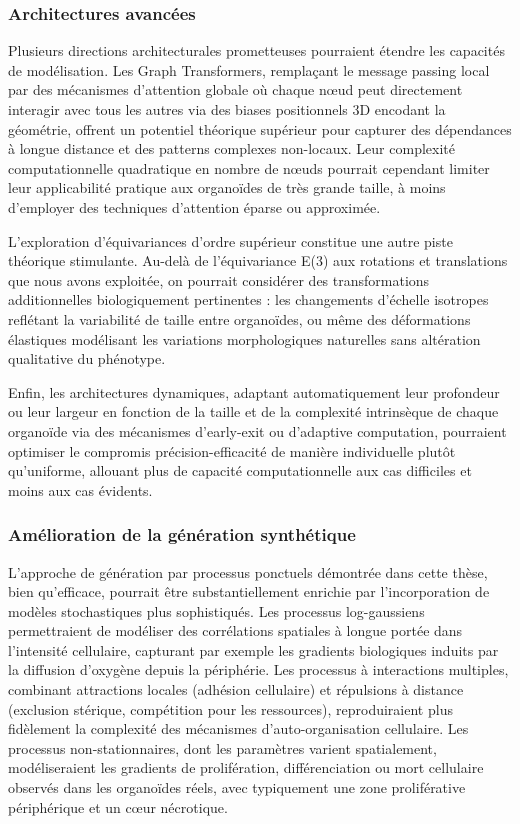 \subsubsection{Architectures avancées}

Plusieurs directions architecturales prometteuses pourraient étendre les capacités de modélisation. Les Graph Transformers, remplaçant le message passing local par des mécanismes d'attention globale où chaque nœud peut directement interagir avec tous les autres via des biases positionnels 3D encodant la géométrie, offrent un potentiel théorique supérieur pour capturer des dépendances à longue distance et des patterns complexes non-locaux. Leur complexité computationnelle quadratique en nombre de nœuds pourrait cependant limiter leur applicabilité pratique aux organoïdes de très grande taille, à moins d'employer des techniques d'attention éparse ou approximée.

L'exploration d'équivariances d'ordre supérieur constitue une autre piste théorique stimulante. Au-delà de l'équivariance E(3) aux rotations et translations que nous avons exploitée, on pourrait considérer des transformations additionnelles biologiquement pertinentes : les changements d'échelle isotropes reflétant la variabilité de taille entre organoïdes, ou même des déformations élastiques modélisant les variations morphologiques naturelles sans altération qualitative du phénotype.

Enfin, les architectures dynamiques, adaptant automatiquement leur profondeur ou leur largeur en fonction de la taille et de la complexité intrinsèque de chaque organoïde via des mécanismes d'early-exit ou d'adaptive computation, pourraient optimiser le compromis précision-efficacité de manière individuelle plutôt qu'uniforme, allouant plus de capacité computationnelle aux cas difficiles et moins aux cas évidents.

\subsubsection{Amélioration de la génération synthétique}

L'approche de génération par processus ponctuels démontrée dans cette thèse, bien qu'efficace, pourrait être substantiellement enrichie par l'incorporation de modèles stochastiques plus sophistiqués. Les processus log-gaussiens permettraient de modéliser des corrélations spatiales à longue portée dans l'intensité cellulaire, capturant par exemple les gradients biologiques induits par la diffusion d'oxygène depuis la périphérie. Les processus à interactions multiples, combinant attractions locales (adhésion cellulaire) et répulsions à distance (exclusion stérique, compétition pour les ressources), reproduiraient plus fidèlement la complexité des mécanismes d'auto-organisation cellulaire. Les processus non-stationnaires, dont les paramètres varient spatialement, modéliseraient les gradients de prolifération, différenciation ou mort cellulaire observés dans les organoïdes réels, avec typiquement une zone proliférative périphérique et un cœur nécrotique.

